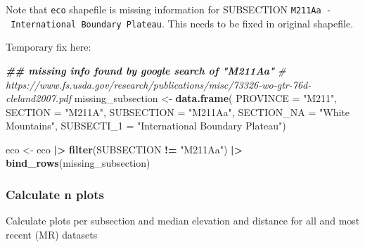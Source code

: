 \documentclass[
]{book}
\newenvironment{Shaded}{\begin{snugshade}}{\end{snugshade}}
\newcommand{\AttributeTok}[1]{\textcolor[rgb]{0.13,0.29,0.53}{#1}}
\newcommand{\CommentTok}[1]{\textcolor[rgb]{0.56,0.35,0.01}{\textit{#1}}}
\newcommand{\DocumentationTok}[1]{\textcolor[rgb]{0.56,0.35,0.01}{\textbf{\textit{#1}}}}
\newcommand{\FunctionTok}[1]{\textcolor[rgb]{0.13,0.29,0.53}{\textbf{#1}}}
\newcommand{\NormalTok}[1]{#1}
\newcommand{\OtherTok}[1]{\textcolor[rgb]{0.56,0.35,0.01}{#1}}
\newcommand{\SpecialCharTok}[1]{\textcolor[rgb]{0.81,0.36,0.00}{\textbf{#1}}}
\newcommand{\StringTok}[1]{\textcolor[rgb]{0.31,0.60,0.02}{#1}}
\begin{document}
Note that \texttt{eco} shapefile is missing information for SUBSECTION \texttt{M211Aa\ -\ International\ Boundary\ Plateau}. This needs to be fixed in original shapefile.

Temporary fix here:

\begin{Shaded}
\begin{Highlighting}[]
\DocumentationTok{\#\# missing info found by google search of "M211Aa"}
\CommentTok{\# https://www.fs.usda.gov/research/publications/misc/73326{-}wo{-}gtr{-}76d{-}cleland2007.pdf}
\NormalTok{missing\_subsection }\OtherTok{\textless{}{-}} \FunctionTok{data.frame}\NormalTok{(}
  \AttributeTok{PROVINCE =} \StringTok{"M211"}\NormalTok{, }
  \AttributeTok{SECTION =} \StringTok{"M211A"}\NormalTok{, }
  \AttributeTok{SUBSECTION =} \StringTok{"M211Aa"}\NormalTok{, }
  \AttributeTok{SECTION\_NA =} \StringTok{"White Mountains"}\NormalTok{,}
  \AttributeTok{SUBSECTI\_1 =} \StringTok{"International Boundary Plateau"}\NormalTok{)}

\NormalTok{eco }\OtherTok{\textless{}{-}}\NormalTok{ eco }\SpecialCharTok{|\textgreater{}}
  \FunctionTok{filter}\NormalTok{(SUBSECTION }\SpecialCharTok{!=} \StringTok{"M211Aa"}\NormalTok{) }\SpecialCharTok{|\textgreater{}}
  \FunctionTok{bind\_rows}\NormalTok{(missing\_subsection)}
\end{Highlighting}
\end{Shaded}

\hypertarget{calculate-n-plots}{%
\subsubsection{Calculate n plots}\label{calculate-n-plots}}

Calculate plots per subsection and median elevation and distance for all and most recent (MR) datasets
\end{document}
